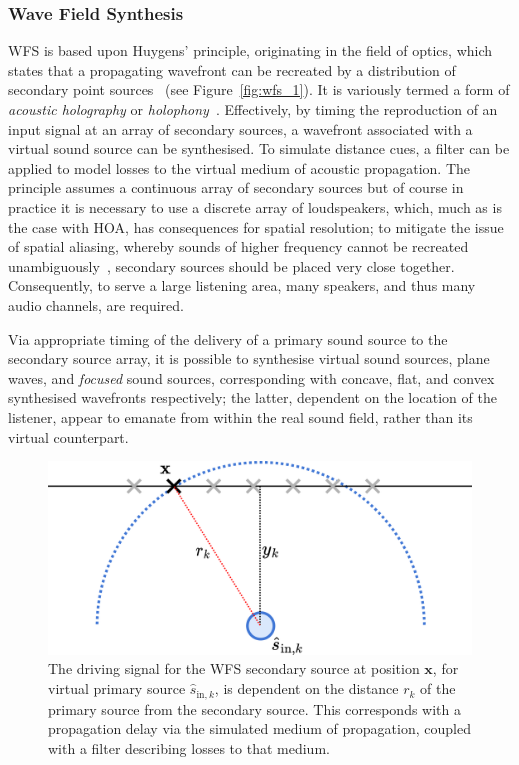 \documentclass[utf8]{FrontiersinHarvard}
\newcommand{\figref}[1]{Figure~\ref{#1}}
\newcommand{\bfx}{\mathbf{x}}
\newcommand{\sigink}{\hat{s}_{\text{in},k}}
\begin{document}
    \subsubsection{Wave Field Synthesis}

    WFS is based upon Huygens' principle, originating in the field of optics, which
    states that a propagating wavefront can be recreated by a distribution of
    secondary point sources~\citep{mueller_acoustic_1971,berkhout_acoustic_1993,
        belloch_performance_2021} (see \figref{fig:wfs_1}).
    It is variously termed a form of \textit{acoustic holography} or
    \textit{holophony}~\citep{berkhout_holographic_1988,ahrens_analytic_2012}.
    Effectively, by timing the reproduction of an input signal at an array of
    secondary sources, a wavefront associated with a virtual sound source can be
    synthesised.
    To simulate distance cues, a filter can be applied to model losses to the
    virtual medium of acoustic propagation.
    The principle assumes a continuous array of secondary sources but of course in
    practice it is necessary to use a discrete array of loudspeakers, which,
    much as is the case with HOA, has consequences for spatial resolution;
    to mitigate the issue of spatial aliasing, whereby sounds of higher frequency
    cannot be recreated unambiguously~\citep{winter_geometric_2018}, secondary
    sources should be placed very close together.
    Consequently, to serve a large listening area, many speakers, and thus many
    audio channels, are required.

    Via appropriate timing of the delivery of a primary sound source to the
    secondary source array, it is possible to synthesise virtual sound sources,
    plane waves, and \textit{focused} sound sources, corresponding with concave,
    flat, and convex synthesised wavefronts respectively; the latter, dependent
    on the location of the listener, appear to emanate from within the real
    sound field, rather than its virtual counterpart.

    \begin{figure}[ht]
        \centering
        \includegraphics[width=.75\textwidth]{figures/wfs_2}
        \caption{
            The driving signal for the WFS secondary source at position $\bfx$,
            for virtual primary source $\sigink$, is dependent on the distance
            $r_k$ of the primary source from the secondary source.
            This corresponds with a propagation delay via the simulated medium of
            propagation, coupled with a filter describing losses to that medium.
        }
        \label{fig:wfs_2}
    \end{figure}
\end{document}
